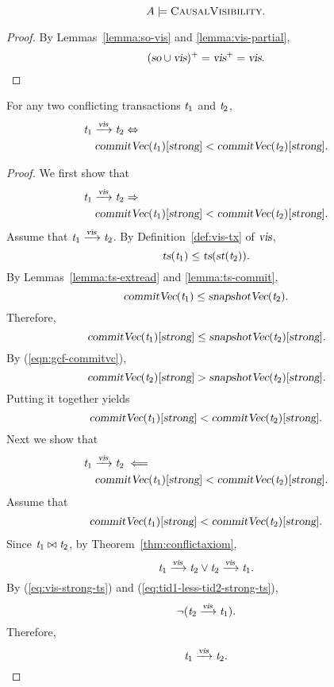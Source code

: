 \begin{apptheorem} \label{thm:cv}
  \[
    A \models \textsc{CausalVisibility}.
  \]
\end{apptheorem}

\begin{proof} \label{proof:cv}
  By Lemmas~\ref{lemma:so-vis} and \ref{lemma:vis-partial},
  \[
    (\textsl{so} \cup \textsl{vis})^{+} = \textsl{vis}^{+} = \textsl{vis}.
  \]
\end{proof}

\begin{applemma}[\prop{5}] \label{lemma:conflict-strong-ts}
  For any two conflicting transactions $\mathit{t}_{1}$ and $\mathit{t}_{2}$,
  \begin{align*}
    &\mathit{t}_{1} \xrightarrow{\textsl{vis}} \mathit{t}_{2} \Leftrightarrow \\
      &\quad \textsl{commitVec}(\mathit{t}_{1})[\textsl{strong}] < \textsl{commitVec}(\mathit{t}_{2})[\textsl{strong}].
  \end{align*}
\end{applemma}

\begin{proof} \label{proof:conflict-strong-ts}
  We first show that
  \begin{align}
    &\tvar_{1} \rel{\vis} \tvar_{2} \implies \label{eq:vis-strong-ts} \\
      &\quad \commitVC(\tvar_{1})[\strongentry] < \commitVC(\tvar_{2})[\strongentry].
      \nonumber
  \end{align}
  Assume that $\mathit{t}_{1} \xrightarrow{\textsl{vis}} \mathit{t}_{2}$.
  By Definition~\ref{def:vis-tx} of $\textsl{vis}$,
  \[
    \textsl{ts}(\mathit{t}_{1}) \le \textsl{ts}(\textsl{st}(\mathit{t}_{2})).
  \]
  By Lemmas~\ref{lemma:ts-extread} and \ref{lemma:ts-commit},
  \[
    \textsl{commitVec}(\mathit{t}_{1}) \le \textsl{snapshotVec}(\mathit{t}_{2}).
  \]
  Therefore,
  \[
    \textsl{commitVec}(\mathit{t}_{1})[\textsl{strong}] \le \textsl{snapshotVec}(\mathit{t}_{2})[\textsl{strong}].
  \]
  By (\ref{eqn:gcf-commitvc}),
  \[
    \textsl{commitVec}(\mathit{t}_{2})[\textsl{strong}] > \textsl{snapshotVec}(\mathit{t}_{2})[\textsl{strong}].
  \]
  Putting it together yields
  \[
    \textsl{commitVec}(\mathit{t}_{1})[\textsl{strong}] < \textsl{commitVec}(\mathit{t}_{2})[\textsl{strong}].
  \]
  Next we show that
  \begin{align*}
    &\mathit{t}_{1} \xrightarrow{\textsl{vis}} \mathit{t}_{2} \impliedby \\
      &\quad \textsl{commitVec}(\mathit{t}_{1})[\textsl{strong}] < \textsl{commitVec}(\mathit{t}_{2})[\textsl{strong}].
  \end{align*}
  Assume that
  \begin{align}
    \textsl{commitVec}(\mathit{t}_{1})[\textsl{strong}] < \textsl{commitVec}(\mathit{t}_{2})[\textsl{strong}].
    \label{eq:tid1-less-tid2-strong-ts}
  \end{align}
  Since $\mathit{t}_{1} \bowtie \mathit{t}_{2}$, by Theorem~\ref{thm:conflictaxiom},
  \[
    \mathit{t}_{1} \xrightarrow{\textsl{vis}} \mathit{t}_{2} \lor \mathit{t}_{2} \xrightarrow{\textsl{vis}} \mathit{t}_{1}.
  \]
  By (\ref{eq:vis-strong-ts}) and (\ref{eq:tid1-less-tid2-strong-ts}),
  \[
    \lnot(\mathit{t}_{2} \xrightarrow{\textsl{vis}} \mathit{t}_{1}).
  \]
  Therefore,
  \[
    \mathit{t}_{1} \xrightarrow{\textsl{vis}} \mathit{t}_{2}.
  \]
\end{proof}

